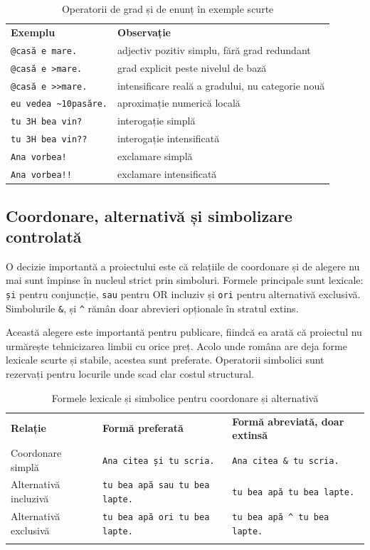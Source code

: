 \documentclass[12pt,onecolumn,letterpaper]{article}
\newcommand{\rs}[1]{\texttt{#1}}
\newcommand{\RStablelayout}{%
\footnotesize
\setlength{\tabcolsep}{6pt}%
\renewcommand{\arraystretch}{1.12}%
\arrayrulecolor{RSRule}%
}
\begin{document}
\begin{table}[h!]
\centering
\RStablelayout
\begin{tabularx}{\linewidth}{@{}lY@{}}
\textbf{Exemplu} & \textbf{Observație} \\
\rs{@casă e mare.} & adjectiv pozitiv simplu, fără grad redundant \\
\rs{@casă e >mare.} & grad explicit peste nivelul de bază \\
\rs{@casă e >>mare.} & intensificare reală a gradului, nu categorie nouă \\
\rs{eu vedea \textasciitilde10pasăre.} & aproximație numerică locală \\
\rs{tu 3H bea vin?} & interogație simplă \\
\rs{tu 3H bea vin??} & interogație intensificată \\
\rs{Ana vorbea!} & exclamare simplă \\
\rs{Ana vorbea!!} & exclamare intensificată \\
\bottomrule
\end{tabularx}
\caption{Operatorii de grad și de enunț în exemple scurte}
\end{table}

\subsection{Coordonare, alternativă și simbolizare controlată}

O decizie importantă a proiectului este că relațiile de coordonare și de alegere
nu mai sunt împinse în nucleul strict prin simboluri. Formele principale sunt
lexicale: \rs{și} pentru conjuncție, \rs{sau} pentru OR incluziv și \rs{ori}
pentru alternativă exclusivă. Simbolurile \rs{\&}, \rs{\textbar{}} și
\rs{\textasciicircum{}} rămân doar abrevieri opționale în stratul extins.

Această alegere este importantă pentru publicare, fiindcă ea arată că proiectul
nu urmărește tehnicizarea limbii cu orice preț. Acolo unde româna are deja forme
lexicale scurte și stabile, acestea sunt preferate. Operatorii simbolici sunt
rezervați pentru locurile unde scad clar costul structural.

\begin{longtable}{@{}p{3.6cm}p{4.2cm}p{4.4cm}@{}}
\rowcolor{RSGray}
\textbf{Relație} & \textbf{Formă preferată} & \textbf{Formă abreviată, doar extinsă} \\
Coordonare simplă & \rs{Ana citea și tu scria.} & \rs{Ana citea \& tu scria.} \\
Alternativă incluzivă & \rs{tu bea apă sau tu bea lapte.} & \rs{tu bea apă \textbar{} tu bea lapte.} \\
Alternativă exclusivă & \rs{tu bea apă ori tu bea lapte.} & \rs{tu bea apă \textasciicircum{} tu bea lapte.} \\
\bottomrule
\caption{Formele lexicale și simbolice pentru coordonare și alternativă}
\end{longtable}
\end{document}
